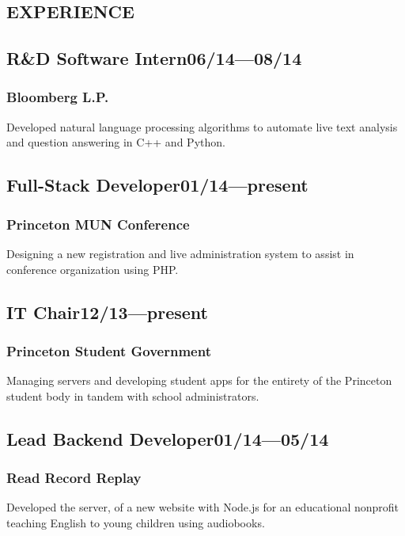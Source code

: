\documentclass[11pt]{article}
\begin{document}
\begin{multicols}{2}
\section*{EXPERIENCE}
\subsection*{R\&D Software Intern\hfill\textnormal{06/14---08/14}}
\subsubsection*{Bloomberg L.P.}
Developed natural language processing algorithms to automate live text analysis and question answering in C++ and Python.

\subsection*{Full-Stack Developer\hfill\textnormal{01/14---present}}
\subsubsection*{Princeton MUN Conference}
Designing a new registration and live administration system to assist in conference organization using PHP.

\subsection*{IT Chair\hfill\textnormal{12/13---present}}
\subsubsection*{Princeton Student Government}
Managing servers and developing student apps for the entirety of the Princeton student body in tandem with school administrators.

\subsection*{Lead Backend Developer\hfill\textnormal{01/14---05/14}}
\subsubsection*{Read Record Replay}
Developed the server, of a new website with Node.js for an educational nonprofit teaching English to young children using audiobooks.


\end{multicols}
\end{document}
